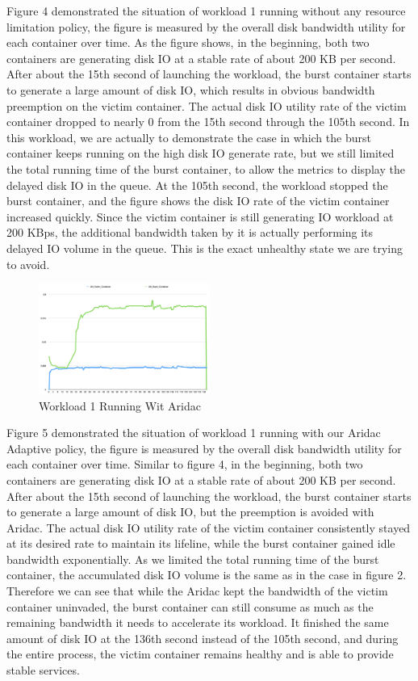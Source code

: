 \documentclass[10pt, conference,compsoc]{IEEEtran}
\begin{document}
Figure 4 demonstrated the situation of workload 1 running without any resource limitation policy, the figure is measured by the overall disk bandwidth utility for each container over time. As the figure shows, in the beginning, both two containers are generating disk IO at a stable rate of about 200 KB per second. After about the 15th second of launching the workload, the burst container starts to generate a large amount of disk IO, which results in obvious bandwidth preemption on the victim container. The actual disk IO utility rate of the victim container dropped to nearly 0 from the 15th second through the 105th second. In this workload, we are actually to demonstrate the case in which the burst container keeps running on the high disk IO generate rate, but we still limited the total running time of the burst container, to allow the metrics to display the delayed disk IO in the queue. At the 105th second, the workload stopped the burst container, and the figure shows the disk IO rate of the victim container increased quickly. Since the victim container is still generating IO workload at 200 KBps, the additional bandwidth taken by it is actually performing its delayed IO volume in the queue. This is the exact unhealthy state we are trying to avoid.\\

\begin{figure}[h]
\centering
\includegraphics[width=0.5\textwidth]{images/workload1_2.png}
\caption{Workload 1 Running Wit Aridac}
\end{figure}


Figure 5 demonstrated the situation of workload 1 running with our Aridac Adaptive policy, the figure is measured by the overall disk bandwidth utility for each container over time. Similar to figure 4, in the beginning, both two containers are generating disk IO at a stable rate of about 200 KB per second. After about the 15th second of launching the workload, the burst container starts to generate a large amount of disk IO, but the preemption is avoided with Aridac. The actual disk IO utility rate of the victim container consistently stayed at its desired rate to maintain its lifeline, while the burst container gained idle bandwidth exponentially. As we limited the total running time of the burst container, the accumulated disk IO volume is the same as in the case in figure 2.  Therefore we can see that while the Aridac kept the bandwidth of the victim container uninvaded, the burst container can still consume as much as the remaining bandwidth it needs to accelerate its workload. It finished the same amount of disk IO at the 136th second instead of the 105th second, and during the entire process, the victim container remains healthy and is able to provide stable services.\\
\end{document}
